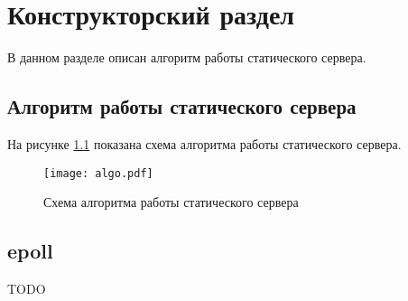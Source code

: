 \chapter{Конструкторский раздел}

В данном разделе описан алгоритм работы статического сервера.

\section{Алгоритм работы статического сервера}

На рисунке \ref{img:algo} показана схема алгоритма работы статического сервера.

\begin{figure}[h!]
    \centering
    \texttt{[image: algo.pdf]}
    \caption{Схема алгоритма работы статического сервера}
    \label{img:algo}
\end{figure}



\section{epoll}
TODO
